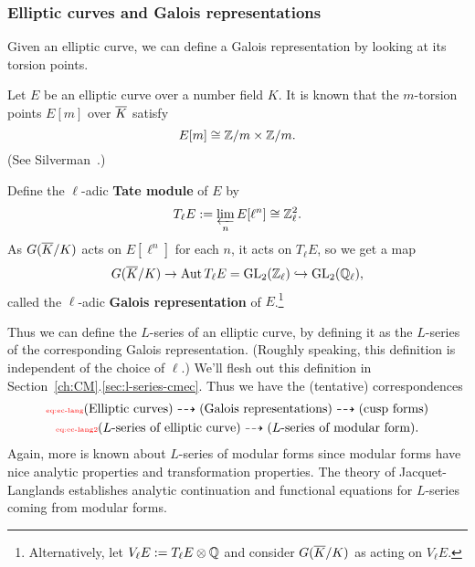 \subsubsection{Elliptic curves and Galois representations}
Given an elliptic curve, we can define a Galois representation by looking at its torsion points.
\begin{df}
Let $E$ be an elliptic curve over a number field $K$. %
It is known that the $m$-torsion points $E[m]$ over $\overline{K}$ satisfy
\[
E[m]\cong \mathbb{Z}/m\times \mathbb{Z}/m.
\]
(See Silverman~\cite[III.6.4]{Si86}.)

Define the $\ell$-adic \textbf{Tate module} of $E$ by
\[
T_{\ell}E:=\varprojlim_n E[\ell^n]\cong\mathbb{Z}_{\ell}^2.
\]
As $G(\overline{K}/K)$ acts on $E[\ell^n]$ for each $n$, it acts on $T_{\ell}E$, so we get a map
\[
G(\overline{K}/K)\to \operatorname{Aut} T_{\ell}E=\operatorname{GL}_2(\mathbb{Z}_{\ell})\hookrightarrow \operatorname{GL}_2(\mathbb{Q}_{\ell}),
\]
called the $\ell$-adic \textbf{Galois representation} of $E$.\footnote{Alternatively, let $V_{\ell}E:=T_{\ell}E\otimes \mathbb{Q}$ and consider $G(\overline{K}/K)$ as acting on $V_{\ell}E$.}
\end{df}
Thus we can define the $L$-series of an elliptic curve, by defining it as the $L$-series of the corresponding Galois representation. (Roughly speaking, this definition is independent of the choice of $\ell$.) We'll flesh out this definition in Section~\ref{ch:CM}.\ref{sec:l-series-cmec}. Thus we have the (tentative) correspondences
\begin{gather}\llabel{eq:ec-lang}
\text{(Elliptic curves)}\dashrightarrow \text{(Galois representations)}
\dashrightarrow \text{(cusp forms)}\\
\llabel{eq:ec-lang2}
(L\text{-series of elliptic curve})\dashrightarrow(L\text{-series of modular form}).
\end{gather}
Again, more is known about $L$-series of modular forms since modular forms have nice analytic properties and transformation properties. The theory of Jacquet-Langlands establishes analytic continuation and functional equations for $L$-series coming from modular forms. 

